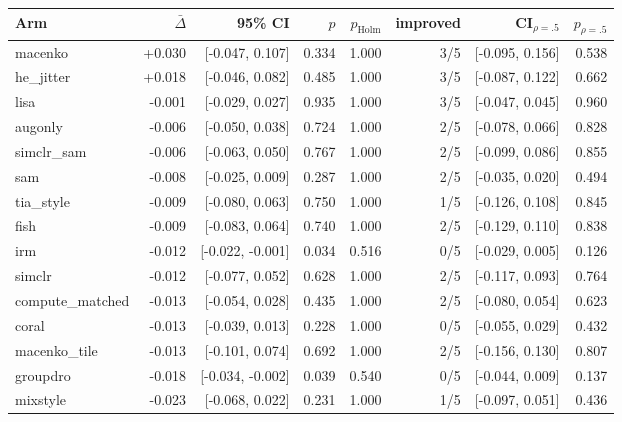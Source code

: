 \begin{tabular}{lrrrrrrr}
\toprule
Arm & $\bar\Delta$ & 95\% CI & $p$ & $p_\text{Holm}$ & improved & CI$_{\rho=.5}$ & $p_{\rho=.5}$ \\
\midrule
macenko & +0.030 & [-0.047, 0.107] & 0.334 & 1.000 & 3/5 & [-0.095, 0.156] & 0.538 \\
he\_jitter & +0.018 & [-0.046, 0.082] & 0.485 & 1.000 & 3/5 & [-0.087, 0.122] & 0.662 \\
lisa & -0.001 & [-0.029, 0.027] & 0.935 & 1.000 & 3/5 & [-0.047, 0.045] & 0.960 \\
augonly & -0.006 & [-0.050, 0.038] & 0.724 & 1.000 & 2/5 & [-0.078, 0.066] & 0.828 \\
simclr\_sam & -0.006 & [-0.063, 0.050] & 0.767 & 1.000 & 2/5 & [-0.099, 0.086] & 0.855 \\
sam & -0.008 & [-0.025, 0.009] & 0.287 & 1.000 & 2/5 & [-0.035, 0.020] & 0.494 \\
tia\_style & -0.009 & [-0.080, 0.063] & 0.750 & 1.000 & 1/5 & [-0.126, 0.108] & 0.845 \\
fish & -0.009 & [-0.083, 0.064] & 0.740 & 1.000 & 2/5 & [-0.129, 0.110] & 0.838 \\
irm & -0.012 & [-0.022, -0.001] & 0.034 & 0.516 & 0/5 & [-0.029, 0.005] & 0.126 \\
simclr & -0.012 & [-0.077, 0.052] & 0.628 & 1.000 & 2/5 & [-0.117, 0.093] & 0.764 \\
compute\_matched & -0.013 & [-0.054, 0.028] & 0.435 & 1.000 & 2/5 & [-0.080, 0.054] & 0.623 \\
coral & -0.013 & [-0.039, 0.013] & 0.228 & 1.000 & 0/5 & [-0.055, 0.029] & 0.432 \\
macenko\_tile & -0.013 & [-0.101, 0.074] & 0.692 & 1.000 & 2/5 & [-0.156, 0.130] & 0.807 \\
groupdro & -0.018 & [-0.034, -0.002] & 0.039 & 0.540 & 0/5 & [-0.044, 0.009] & 0.137 \\
mixstyle & -0.023 & [-0.068, 0.022] & 0.231 & 1.000 & 1/5 & [-0.097, 0.051] & 0.436 \\
\bottomrule
\end{tabular}
